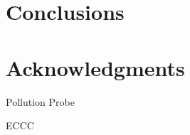 \documentclass[authoryear]{elsarticle}
\begin{document}
\section{Conclusions}

\section{Acknowledgments}
{\color{red}Pollution Probe}

{\color{red}ECCC}

%
%
%
\end{document}
